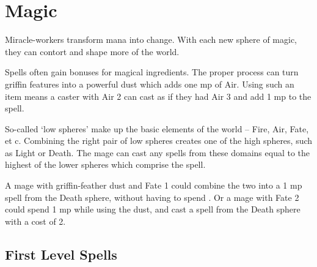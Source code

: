 \chapter[Chamber of Magic]{Magic}

\begin{multicols}{2}



\noindent
Miracle-workers transform mana into change.
With each new sphere of magic, they can contort and shape more of the world.

Spells often gain bonuses for magical ingredients.
The proper process can turn griffin features into a powerful dust which adds one \gls{mp} of Air.
Using such an item means a caster with Air 2 can cast as if they had Air 3 and add 1 \gls{mp} to the spell.

So-called `low spheres' make up the basic elements of the world -- Fire, Air, Fate, et c.
Combining the right pair of low spheres creates one of the high spheres, such as Light or Death.
The mage can cast any spells from these domains equal to the highest of the lower spheres which comprise the spell.

A mage with griffin-feather dust and Fate 1 could combine the two into a 1 \gls{mp} spell from the Death sphere, without having to spend .
Or a mage with Fate 2 could spend 1 \gls{mp} while using the dust, and cast a spell from the Death sphere with a cost of 2.

\end{multicols}

\section{First Level Spells}

